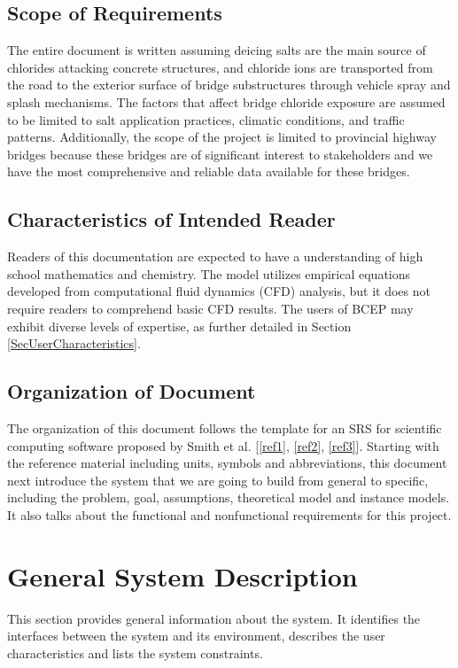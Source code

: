 \documentclass[12pt]{article}
\newcommand{\reref}[1]{\ref{#1}}
\begin{document}
\subsection{Scope of Requirements} 
The entire document is written assuming deicing salts are the main source of chlorides attacking concrete structures, and chloride ions are transported from the road to the exterior surface of bridge substructures through vehicle spray and splash mechanisms. The factors that affect bridge chloride exposure are assumed to be limited to salt application practices, climatic conditions, and traffic patterns. Additionally, the scope of the project is limited to provincial highway bridges because these bridges are of significant interest to stakeholders and we have the most comprehensive and reliable data available for these bridges. 

\subsection{Characteristics of Intended Reader} \label{sec_IntendedReader}
Readers of this documentation are expected to have a understanding of high school mathematics and chemistry. The model utilizes empirical equations developed from computational fluid dynamics (CFD) analysis, but it does not require readers to comprehend basic CFD results. The users of BCEP may exhibit diverse levels of expertise, as further detailed in Section \ref{SecUserCharacteristics}.

\subsection{Organization of Document}
The organization of this document follows the template for an SRS for scientific computing software proposed by Smith et al. [\reref{ref1}, \reref{ref2}, \reref{ref3}]. Starting with the reference material including units, symbols and abbreviations, this document next introduce the system that we are going to build from general to specific, including the problem, goal, assumptions, theoretical model and instance models. It also talks about the functional and nonfunctional requirements for this project.

\section{General System Description}

This section provides general information about the system.  It identifies the
interfaces between the system and its environment, describes the user
characteristics and lists the system constraints.  
\end{document}
